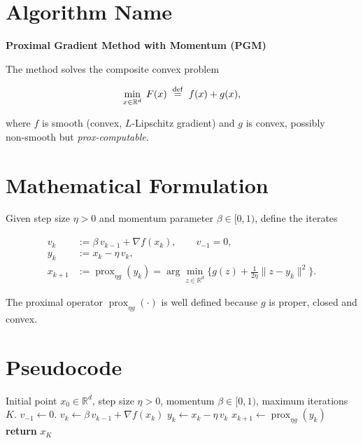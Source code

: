 \documentclass{article}
\newcommand{\prox}{\operatorname{prox}}
\newcommand{\grad}{\nabla}
\newcommand{\R}{\mathbb{R}}
\begin{document}
\section*{Algorithm Name}
\textbf{Proximal Gradient Method with Momentum (PGM)}  

The method solves the composite convex problem  

\[
\min_{x\in\R^{d}} \; F(x)\;\stackrel{\rm def}{=}\; f(x)+g(x),
\]

where $f$ is smooth (convex, $L$‑Lipschitz gradient) and $g$ is convex, possibly non‑smooth but \emph{prox‑computable}.

\section*{Mathematical Formulation}
Given step size $\eta>0$ and momentum parameter $\beta\in[0,1)$, define the iterates  

\[
\begin{aligned}
v_{k}      &:= \beta\,v_{k-1}+ \grad f(x_{k}) ,\qquad v_{-1}=0,\\[2mm]
y_{k}      &:= x_{k}-\eta\,v_{k},\\[2mm]
x_{k+1}    &:= \prox_{\eta g}(y_{k})
          =\arg\min_{z\in\R^{d}}\Big\{ g(z)+\frac{1}{2\eta}\|z-y_{k}\|^{2}\Big\}.
\end{aligned}
\tag{PGM}
\]

The proximal operator $\prox_{\eta g}(\cdot)$ is well defined because $g$ is proper, closed and convex.

\section*{Pseudocode}
\begin{algorithm}[H]
\caption{Proximal Gradient with Momentum (PGM)}
\begin{algorithmic}[1]
\Require Initial point $x_{0}\in\R^{d}$, step size $\eta>0$, momentum $\beta\in[0,1)$,
        maximum iterations $K$.
\State $v_{-1}\gets 0$.
    \State $v_{k}\gets \beta\,v_{k-1}+ \grad f(x_{k})$ \hfill{}
    \State $y_{k}\gets x_{k}-\eta\,v_{k}$                     \hfill{}
    \State $x_{k+1}\gets \prox_{\eta g}(y_{k})$               \hfill{}
\EndFor
\State \textbf{return} $x_{K}$
\end{algorithmic}
\end{algorithm}
\end{document}
